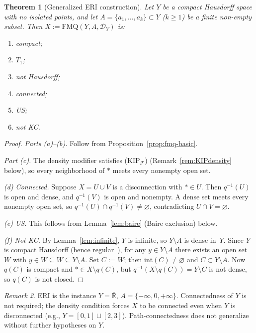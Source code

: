 \documentclass[11pt]{article}
\newtheorem{theorem}{Theorem}[section]
\theoremstyle{definition}
\theoremstyle{remark}
\newtheorem{remark}[theorem]{Remark}
\begin{document}
\begin{theorem}[Generalized ERI construction]\label{thm:general}
Let $Y$ be a compact Hausdorff space with no isolated points, and let
$A = \{a_1, \ldots, a_k\} \subset Y$ ($k \geq 1$) be a finite non-empty
subset.
Then $X := \mathrm{FMQ}(Y, A, \mathcal{D}_Y)$ is:
\begin{enumerate}[label=\textup{(\alph*)},nosep]
\item compact;
\item $T_1$;
\item not Hausdorff;
\item connected;
\item US;
\item not KC.
\end{enumerate}
\end{theorem}
\begin{proof}
\emph{Parts (a)--(b).}\; Follow from
Proposition~\ref{prop:fmq-basic}.

\emph{Part (c).}\; The density modifier satisfies
\textup{(KIP$_{\mathcal{F}}$)} (Remark~\ref{rem:KIPdensity} below),
so every neighborhood of $\ast$ meets every nonempty open set.

\emph{(d) Connected.}\;
Suppose $X = U \cup V$ is a disconnection with $\ast \in U$.
Then $q^{-1}(U)$ is open and dense, and $q^{-1}(V)$ is open and nonempty.
A dense set meets every nonempty open set, so
$q^{-1}(U) \cap q^{-1}(V) \neq \varnothing$, contradicting
$U \cap V = \varnothing$.

\emph{(e) US.}\;
This follows from Lemma~\ref{lem:baire} (Baire exclusion) below.

\emph{(f) Not KC.}\;
By Lemma~\ref{lem:infinite}, $Y$ is infinite, so $Y \setminus A$ is
dense in~$Y$.
Since $Y$ is compact Hausdorff (hence
regular~\cite{bib:willard}), for any $y \in Y \setminus A$ there exists
an open set $W$ with
$y \in W \subseteq \overline{W} \subseteq Y \setminus A$.
Set $C := \overline{W}$; then $\mathrm{int}(C) \neq \varnothing$
and $C \subset Y \setminus A$.
Now $q(C)$ is compact and
$\ast \in X \setminus q(C)$, but
$q^{-1}(X \setminus q(C)) = Y \setminus C$ is not dense, so $q(C)$
is not closed.
\end{proof}

\begin{remark}\label{rem:geninstances}
ERI is the instance $Y = \overline{\mathbb{R}}$,
$A = \{-\infty, 0, +\infty\}$.
Connectedness of $Y$ is not required; the density condition forces
$X$ to be connected even when $Y$ is disconnected
(e.g., $Y = [0,1] \sqcup [2,3]$).
Path-connectedness does not generalize without further hypotheses on $Y$.
\end{remark}
\end{document}
